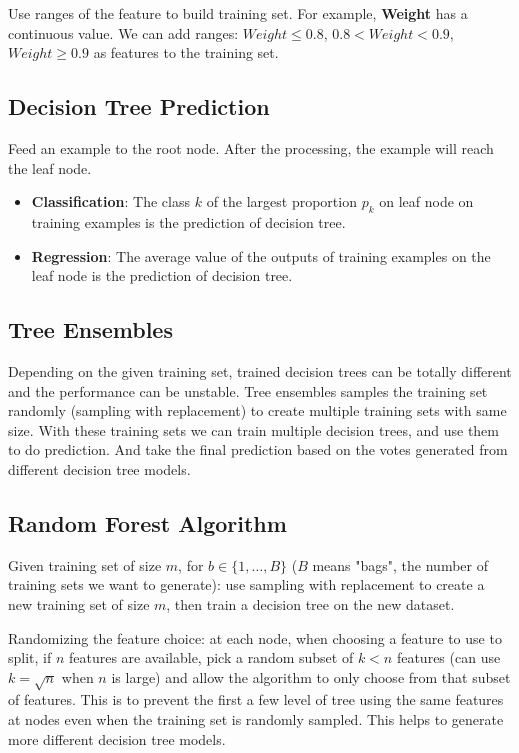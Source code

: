 \documentclass{article}
\begin{document}
Use ranges of the feature to build training set. For example, \textbf{Weight} has a continuous value. We can add ranges: \(Weight \leq 0.8\), \(0.8 < Weight < 0.9\), \(Weight \geq 0.9\) as features to the training set.

\subsection{Decision Tree Prediction}

Feed an example to the root node. After the processing, the example will reach the leaf node.
\begin{itemize}
    \item \textbf{Classification}: The class \(k\) of the largest proportion \(p_{k}\) on leaf node on training examples is the prediction of decision tree.
    \item \textbf{Regression}: The average value of the outputs of training examples on the leaf node is the prediction of decision tree.
\end{itemize}

\subsection{Tree Ensembles}

Depending on the given training set, trained decision trees can be totally different and the performance can be unstable. Tree ensembles samples the training set randomly (sampling with replacement) to create multiple training sets with same size. With these training sets we can train multiple decision trees, and use them to do prediction. And take the final prediction based on the votes generated from different decision tree models.

\subsection{Random Forest Algorithm}

Given training set of size \(m\), for \(b \in \{1, \dots, B\}\) (\(B\) means "bags", the number of training sets we want to generate): use sampling with replacement to create a new training set of size \(m\),
then train a decision tree on the new dataset.

Randomizing the feature choice: at each node, when choosing a feature to use to split, if \(n\) features are available, pick a random subset of \(k < n\) features (can use \(k = \sqrt{n}\) when \(n\) is large) and allow the algorithm to only choose from that subset of features. This is to prevent the first a few level of tree using the same features at nodes even when the training set is randomly sampled. This helps to generate more different decision tree models.
\end{document}
